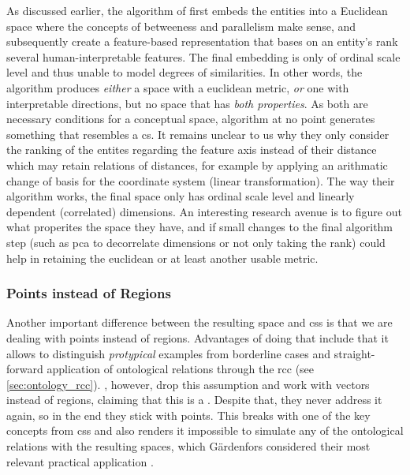 As discussed earlier, the algorithm of \textcite{Derrac2015} first embeds the entities into a Euclidean space where the concepts of betweeness and parallelism make sense, and subsequently create a feature-based representation that bases on an entity's rank \wrt several human-interpretable features. The final embedding is only of ordinal scale level and thus unable to model  degrees of similarities. In other words, the algorithm produces \textit{either} a space with a euclidean metric, \textit{or} one with interpretable directions, but no space that has \textit{both properties}. As both are necessary conditions for a conceptual space,  algorithm at no point generates something that resembles a \gls{cs}. It remains unclear to us why they only consider the ranking of the entites regarding the feature axis instead of their distance which may retain relations of distances, for example by applying an arithmatic change of basis for the coordinate system (linear transformation). The way their algorithm works, the final space only has ordinal scale level and linearly dependent (correlated) dimensions. An interesting research avenue is to figure out what properites the space they have, and if small changes to the final algorithm step (such as \gls{pca} to decorrelate dimensions or not only taking the rank) could help in retaining the euclidean or at least another usable metric.

\subsubsection*{Points instead of Regions}

Another important difference between the resulting space and \glspl{cs} is that we are dealing with points instead of regions. Advantages of doing that include that it allows to distinguish \textit{protypical} examples from borderline cases \cite{Gardenfors2000a} and straight-forward application of ontological relations through the \gls{rcc} (see \autoref{sec:ontology_rcc}). \textcite{Derrac2015}, however, drop this assumption and work with vectors instead of regions, claiming that this is a  \cite[8]{Derrac2015}. Despite that, they never address it again, so in the end they stick with points. This breaks with one of the key concepts from \glspl{cs} and also renders it impossible to simulate any of the ontological relations with the resulting spaces, which Gärdenfors considered their most relevant practical application \cite{Gardenfors2004}. 

